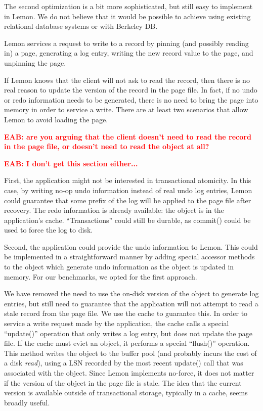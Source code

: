 \documentclass[letterpaper,twocolumn,english]{article}
\newcommand{\yad}{Lemon\xspace}
\newcommand{\eab}[1]{\textcolor{red}{\bf EAB: #1}}
\begin{document}

The second optimization is a bit more sophisticated, but still easy to
implement in \yad.  We do not believe that it would be possible to
achieve using existing relational database systems or with Berkeley
DB.  

\yad services a request to write to a record by pinning (and possibly
reading in) a page, generating a log entry, writing the
new record value to the page, and unpinning the page.

If \yad knows that the client will not ask to read the record, then
there is no real reason to update the version of the record in the
page file.  In fact, if no undo or redo information needs to be
generated, there is no need to bring the page into memory in 
order to service a write.
There are at least two scenarios that allow \yad to avoid loading the page.

\eab{are you arguing that the client doesn't need to read the record in the page file, or doesn't need to read the object at all?}


\eab{I don't get this section either...}

First, the application might not be interested in transactional
atomicity.  In this case, by writing no-op undo information instead of
real undo log entries, \yad could guarantee that some prefix of the
log will be applied to the page file after recovery.  The redo
information is already available: the object is in the application's
cache.  ``Transactions'' could still be durable, as commit() could be
used to force the log to disk.  

Second, the application could provide the undo information to \yad.
This could be implemented in a straightforward manner by adding
special accessor methods to the object which generate undo information
as the object is updated in memory.  For our benchmarks, we opted for
the first approach.

We have removed the need to use the on-disk version of the object to
generate log entries, but still need to guarantee that the application
will not attempt to read a stale record from the page file.  We use
the cache to guarantee this.  In order to service a write
request made by the application, the cache calls a special
``update()'' operation that only writes a log entry, but does not 
update the page file.  If the
cache must evict an object, it performs a special ``flush()''
operation.  This method writes the object to the buffer pool (and
probably incurs the cost of a disk {\em read}), using a LSN recorded by the
most recent update() call that was associated with the object.  Since
\yad implements no-force, it does not matter if the
version of the object in the page file is stale. The idea that the
current version is available outside of transactional storage, 
typically in a cache, seems broadly useful.
\end{document}
